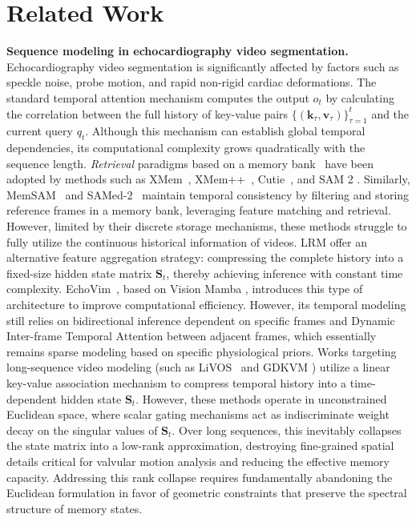 \section{Related Work}
    \label{sec:related}

\noindent
\textbf{Sequence modeling in echocardiography video segmentation.} 
Echocardiography video segmentation is significantly affected by factors such as speckle noise, probe motion, and rapid non-rigid cardiac deformations.
The standard temporal attention mechanism \cite{NIPS17_Attention,ICLR21_vit,TMI24_DSA} computes the output $o_t$ by calculating the correlation between the full history of key-value pairs $\{(\boldsymbol{k}_\tau, \boldsymbol{v}_\tau)\}_{\tau=1}^t$ and the current query $q_t$.
Although this mechanism can establish global temporal dependencies, its computational complexity grows quadratically with the sequence length.
\emph{Retrieval} paradigms based on a memory bank~\cite{iccv19_stm,neurips21_stm} have been adopted by methods such as XMem~\cite{eccv22_xmem}, XMem++~\cite{iccv25_xmempp}, Cutie~\cite{cvpr24_cutie}, and SAM 2 \cite{ICLR25_SAM2,CVPR25_DAM}.
Similarly, MemSAM~\cite{deng2024memsam} and SAMed-2~\cite{MICCAI25_SAMed2} maintain temporal consistency by filtering and storing reference frames in a memory bank, leveraging feature matching and retrieval.
However, limited by their discrete storage mechanisms, these methods struggle to fully utilize the continuous historical information of videos.
LRM \cite{katharopoulos_transformers_2020,ICML20_ttt,ICML21_fwp,ICLR25_gdn,ICLR26_ttt_LaCT} offer an alternative feature aggregation strategy: compressing the complete history into a fixed-size hidden state matrix $\mathbf{S}_t$, thereby achieving inference with constant time complexity.
EchoVim~\cite{mm25_echovim}, based on Vision Mamba \cite{CLM24_mamba,ICML24_mamba2,eccv24_videomamba}, introduces this type of architecture to improve computational efficiency.
However, its temporal modeling still relies on bidirectional inference dependent on specific frames and Dynamic Inter-frame Temporal Attention between adjacent frames, which essentially remains sparse modeling based on specific physiological priors.
Works targeting long-sequence video modeling (such as LiVOS~\cite{Liu_2025_CVPR} and GDKVM \cite{ICLR25_gdn,ICCV25_gdkvm}) utilize a linear key-value association mechanism to compress temporal history into a time-dependent hidden state $\mathbf{S}_t$.
However, these methods operate in unconstrained Euclidean space, where scalar gating mechanisms act as indiscriminate weight decay on the singular values of $\mathbf{S}_t$.
Over long sequences, this inevitably collapses the state matrix into a low-rank approximation, destroying fine-grained spatial details critical for valvular motion analysis and reducing the effective memory capacity.
Addressing this rank collapse requires fundamentally abandoning the Euclidean formulation in favor of geometric constraints that preserve the spectral structure of memory states.

